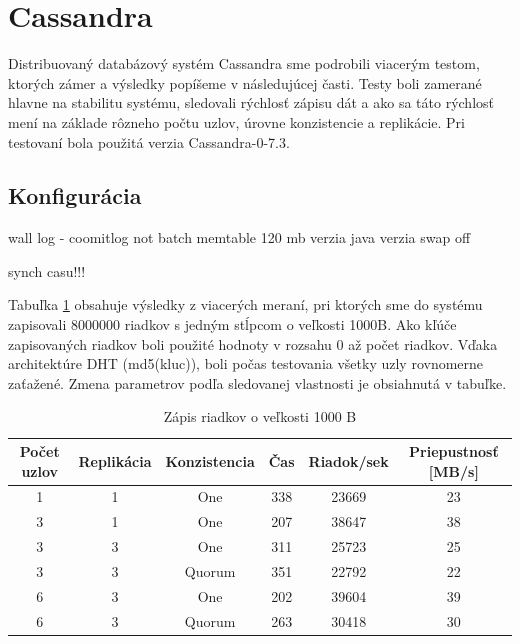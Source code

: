 \documentclass[11pt,twoside,a4paper]{book}
\begin{document}
\section{Cassandra}

Distribuovaný databázový systém Cassandra sme podrobili viacerým testom, ktorých zámer a výsledky popíšeme v následujúcej časti. Testy boli zamerané hlavne na stabilitu systému, sledovali rýchlosť zápisu dát a ako sa táto rýchlosť mení na základe rôzneho počtu uzlov, úrovne konzistencie a replikácie. Pri testovaní bola použitá verzia Cassandra-0-7.3.

\subsection*{Konfigurácia}
wall log - coomitlog
not batch
memtable 120 mb
verzia
java verzia
swap off

synch casu!!!



Tabuľka \ref{tab:CPerf2} obsahuje výsledky z viacerých meraní, pri ktorých sme do systému zapisovali 8000000 riadkov s jedným stĺpcom o veľkosti 1000B. Ako kľúče zapisovaných riadkov boli použité hodnoty v rozsahu 0 až počet riadkov. Vďaka architektúre DHT (md5(kluc)), boli počas testovania všetky uzly rovnomerne zaťažené. Zmena parametrov podľa sledovanej vlastnosti je obsiahnutá v tabuľke.

\begin{table}[hp]
\begin{center}
\begin{tabular}{|c|c|c|c|c|c|}
\hline Počet uzlov & Replikácia & Konzistencia & Čas & Riadok/sek & Priepustnosť [MB/s]\\ 
\hline
\hline 1 & 1 & One & 338 & 23669 & 23\\ 
\hline 3 & 1 & One & 207 & 38647 & 38\\ 
\hline 3 & 3 & One & 311 & 25723 & 25\\ 
\hline 3 & 3 & Quorum & 351 & 22792 & 22\\ 
\hline 6 & 3 & One & 202 & 39604 & 39\\ 
\hline 6 & 3 & Quorum & 263 & 30418 & 30\\ 
\hline
\end{tabular} 
\end{center}
\caption{Zápis riadkov o veľkosti 1000 B}
\label{tab:CPerf2}
\end{table}
\end{document}
